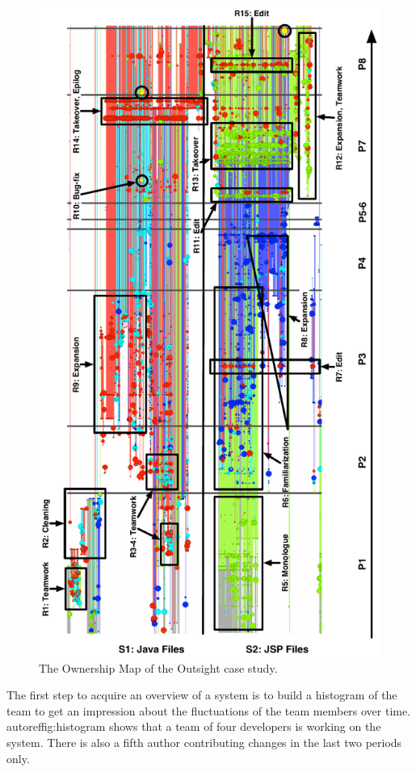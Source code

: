 \begin{figure}[htbp]
\begin{center}
\includegraphics[height=21.3cm]{fig/chronia-outsight}
\caption{The Ownership Map of the Outsight case study.}
\label{fig:casestudy-outsight}
\end{center}
\end{figure}

The first step to acquire an overview of a system is to build a histogram of the team to get an impression about the fluctuations of the team members over time. autoref{fig:histogram} shows that a team of four developers is working on the system. There is also a fifth author contributing changes in the last two periods only.



